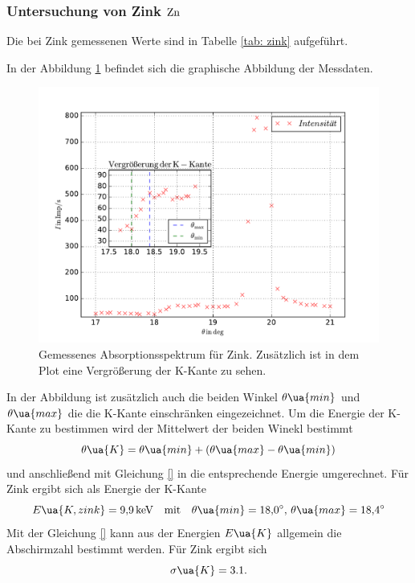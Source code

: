 \subsubsection{Untersuchung von Zink $\ce{Zn}$}\label{sec: zink}
Die bei Zink gemessenen Werte sind in Tabelle \ref{tab: zink} aufgeführt.

In der Abbildung \ref{fig: absotp_zink} befindet sich die graphische Abbildung der Messdaten.
\begin{figure}
  \centering
  \includegraphics[width=1\textwidth]{../Messdaten/zink.pdf}
  \caption{Gemessenes Absorptionsspektrum für Zink. Zusätzlich ist in dem Plot eine Vergrößerung der K-Kante zu sehen.} %
  \label{fig: absotp_zink}
\end{figure}
In der Abbildung ist zusätzlich auch die beiden Winkel $\theta\ua{min}$ und $\theta\ua{max}$ die die K-Kante einschränken
eingezeichnet. Um die Energie der K-Kante zu bestimmen wird der Mittelwert der beiden Winekl bestimmt
\begin{equation}
  \label{eq:theta_k}
  \theta\ua{K}=\theta\ua{min}+\left(\theta\ua{max}-\theta\ua{min}\right)
\end{equation}
und anschließend mit Gleichung \eqref{} in die entsprechende Energie umgerechnet.
Für Zink ergibt sich als Energie der K-Kante
\begin{equation*}
  E\ua{K,zink}=\SI{9.9}{\kilo\eV} \quad \text{mit}\quad \theta\ua{min}=\SI{18.0}{\degree},\,\theta\ua{max}=\SI{18.4}{\degree}
\end{equation*}
Mit der Gleichung \eqref{} kann aus der Energien $E\ua{K}$ allgemein die Abschirmzahl
bestimmt werden.
Für Zink ergibt sich
\begin{equation}
  \label{eq: abschirm_zink}
  \sigma\ua{K}=3.1.
\end{equation}
